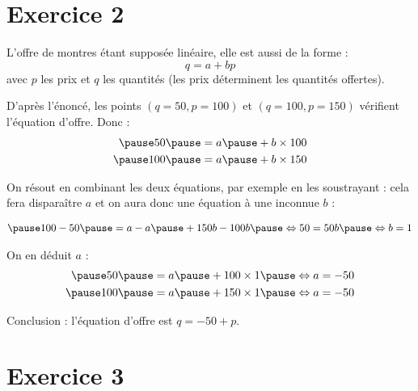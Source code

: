 \documentclass[9pt,professionalfonts,handout,hyperref]{beamer}
\begin{document}
\section{Exercice 2}

%
\begin{frame}
	
	L'offre de montres étant supposée linéaire, elle est aussi de la forme : $$q = a + bp $$ avec $p$ les prix et $q$ les quantités (les prix déterminent les quantités offertes).\newline
	
	\pause D'après l'énoncé, les points $(q=50,p=100)$ et $(q=100,p=150)$ vérifient l'équation d'offre. \pause Donc : 
	\[
	\begin{aligned}
\pause 	50 \pause &= a \pause + b\times 100 \\
\pause 	100 \pause &= a \pause + b\times 150 
	\end{aligned}
	\]
	
\pause 	On résout en combinant les deux équations, par exemple en les soustrayant : cela fera disparaître $a$ et on aura donc une équation à une inconnue $b$ : 
	
	\[
	\begin{aligned}
\pause 	&100-50 \pause = a-a \pause + 150b -100b 
\pause 	\Leftrightarrow50 = 50b 	\pause \Leftrightarrow b = 1 \\
	\end{aligned}
	\]
	
\pause 	On en déduit $a$ : 
	\[
	\begin{aligned}
\pause 	50 \pause &= a \pause + 100\times 1 \pause \Leftrightarrow  a = -50\\
\pause 	100 \pause &= a \pause + 150 \times 1 \pause \Leftrightarrow  a = -50
	\end{aligned}
	\]
	
\medskip 	
\pause Conclusion : l'équation d'offre est $q = -50 +p $. 

\end{frame}

\section{Exercice 3}

%
%
\end{document}
